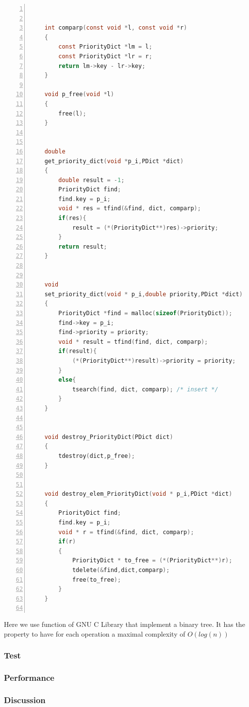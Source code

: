 \documentclass[twoside,12pt, a4paper]{report}
\begin{document}
\begin{lstlisting}[language=C, % Spécifie le langage du code
	caption={Priority Map method}, % Légende du listing
	label=lst:prmap_c, % Étiquette pour référencer le listing
	numbers=left, 
	numberstyle=\tiny\color{gray}, 
	stepnumber=1, 
	frame=single,
	breaklines=true, 
	postbreak=\mbox{\textcolor{red}{$\hookrightarrow$}\space},
	showstringspaces=false 
	]
	
	
	int comparp(const void *l, const void *r)
	{
		const PriorityDict *lm = l;
		const PriorityDict *lr = r;
		return lm->key - lr->key;
	}
	
	void p_free(void *l)
	{
		free(l);
	}
	
	
	double
	get_priority_dict(void *p_i,PDict *dict)
	{
		double result = -1;
		PriorityDict find;
		find.key = p_i;
		void * res = tfind(&find, dict, comparp);
		if(res){
			result = (*(PriorityDict**)res)->priority;
		}
		return result;
	}
	
	
	void
	set_priority_dict(void * p_i,double priority,PDict *dict)
	{
		PriorityDict *find = malloc(sizeof(PriorityDict));
		find->key = p_i;
		find->priority = priority;
		void * result = tfind(find, dict, comparp);
		if(result){
			(*(PriorityDict**)result)->priority = priority;
		}
		else{
			tsearch(find, dict, comparp); /* insert */
		}
	}
	
	
	void destroy_PriorityDict(PDict dict)
	{
		tdestroy(dict,p_free);
	}
	
	
	void destroy_elem_PriorityDict(void * p_i,PDict *dict)
	{
		PriorityDict find;
		find.key = p_i;
		void * r = tfind(&find, dict, comparp);
		if(r)
		{
			PriorityDict * to_free = (*(PriorityDict**)r);
			tdelete(&find,dict,comparp);
			free(to_free);
		}
	}
	
\end{lstlisting}

Here we use function of GNU C Library that implement a binary tree. It has the property to have for each operation a maximal complexity of $O(log(n))$

\subsubsection{Test}
\subsubsection{Performance}
\subsubsection{Discussion}
\end{document}
